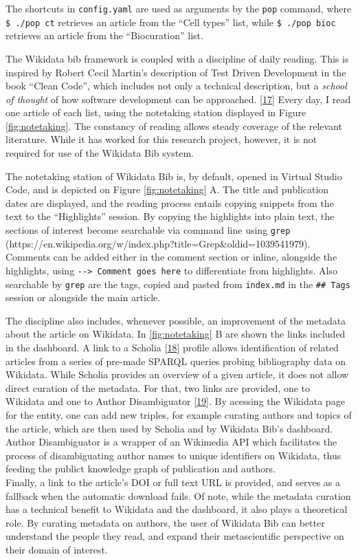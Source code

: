The shortcuts in \texttt{config.yaml} are used as arguments by the \texttt{pop} command, where \texttt{\$\ ./pop\ ct} retrieves an article from the ``Cell types'' list, while \texttt{\$\ ./pop\ bioc} retrieves an article from the ``Biocuration'' list.

The Wikidata bib framework is coupled with a discipline of daily reading.
This is inspired by Robert Cecil Martin's description of Test Driven Development in the book ``Clean Code'', which includes not only a technical description, but a \emph{school of thought} of how software development can be approached. {[}\protect\hyperlink{ref-13HqB23xH}{17}{]}
Every day, I read one article of each list, using the notetaking station displayed in Figure \ref{fig:notetaking}.
The constancy of reading allows steady coverage of the relevant literature.
While it has worked for this research project, however, it is not required for use of the Wikidata Bib system.

The notetaking station of Wikidata Bib is, by default, opened in Virtual Studio Code, and is depicted on Figure \ref{fig:notetaking} A.
The title and publication dates are displayed, and the reading process entails copying snippets from the text to the ``Highlights'' session.
By copying the highlights into plain text, the sections of interest become searchable via command line using \texttt{grep} (https://en.wikipedia.org/w/index.php?title=Grep\&oldid=1039541979).
Comments can be added either in the comment section or inline, alongside the highlights, using \texttt{-\/-\textgreater{}\ Comment\ goes\ here} to differentiate from highlights.
Also searchable by \texttt{grep} are the tags, copied and pasted from \texttt{index.md} in the \texttt{\#\#\ Tags} session or alongside the main article.

The discipline also includes, whenever possible, an improvement of the metadata about the article on Wikidata.
In \ref{fig:notetaking} B are shown the links included in the dashboard.
A link to a Scholia {[}\protect\hyperlink{ref-hxzL9pmm}{18}{]} profile allows identification of related articles from a series of pre-made SPARQL queries probing bibliography data on Wikidata.
While Scholia provides an overview of a given article, it does not allow direct curation of the metadata.
For that, two links are provided, one to Wikidata and one to Author Disambiguator {[}\protect\hyperlink{ref-1A9RvszKC}{19}{]}.
By acessing the Wikidata page for the entity, one can add new triples, for example curating authors and topics of the article, which are then used by Scholia and by Wikidata Bib's dashboard.
Author Disambiguator is a wrapper of an Wikimedia API which facilitates the process of disambiguating author names to unique identifiers on Wikidata, thus feeding the publict knowledge graph of publication and authors.\\
Finally, a link to the article's DOI or full text URL is provided, and serves as a fallback when the automatic download fails.
Of note, while the metadata curation has a technical benefit to Wikidata and the dashboard, it also plays a theoretical role.
By curating metadata on authors, the user of Wikidata Bib can better understand the people they read, and expand their metascientific perspective on their domain of interest.

